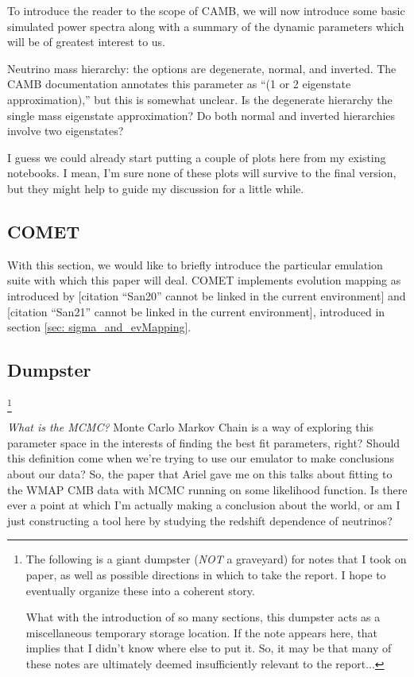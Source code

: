 \documentclass[11pt]{article}
\newcommand{\cbib}[1]
{\IfFileExists{biblatex.sty}
{\cite{#1}}
{[citation ``#1'' cannot be linked in the current environment]}}
\begin{document}
To introduce the reader to the scope of CAMB, we will now introduce
some basic simulated power spectra along with a summary of the dynamic
parameters which will be of greatest interest to us.

Neutrino mass hierarchy: the options are degenerate, normal, and inverted.
The CAMB documentation annotates this parameter as ``(1 or 2 eigenstate
approximation),'' but this is somewhat unclear. Is the degenerate
hierarchy the single mass eigenstate approximation? Do both normal
and inverted hierarchies involve two eigenstates?

I guess we could already start putting a couple of plots here from my existing
notebooks. I mean, I'm sure none of these plots will survive to the final
version, but they might help to guide my discussion for a little while.

\begin{centering}
\section{COMET}
\end{centering}

With this section, we would like to briefly introduce the particular emulation
suite with
which this paper will deal. COMET implements evolution mapping as introduced
by \cbib{San20} and \cbib{San21}, introduced in section
\ref{sec: sigma_and_evMapping}.

\begin{centering}
\section{Dumpster}
\end{centering}

\footnote{
    The following is a giant dumpster (\textit{NOT} a graveyard) for notes
    that I took on paper, as well as possible directions in which to take the
    report. I hope to eventually organize these into a coherent story.

    What with the introduction of so many
    sections, this dumpster acts as a miscellaneous
    temporary storage location. If the note appears here, that implies that I
    didn't know where else to put it. So, it may be that many of these notes
    are ultimately deemed insufficiently relevant to the report...
}

\textit{What is the MCMC?} Monte Carlo Markov Chain is a way of exploring this
parameter space in the interests of finding the best fit parameters, right?
Should this definition come
when we're trying to use our emulator to make conclusions about our data?
So, the paper that Ariel gave me on this talks about fitting to the WMAP
CMB data with MCMC running on some likelihood function. Is there ever a point
at which I'm actually making a conclusion about the world, or am I just
constructing a tool here by studying the redshift dependence of neutrinos?
\end{document}

